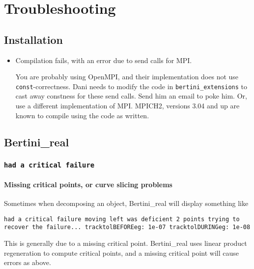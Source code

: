 
\section{Troubleshooting}

	\subsection{Installation}

	\begin{itemize}
	\item Compilation fails, with an error due to send calls for MPI.  

	You are probably using OpenMPI, and their implementation does not use {\tt const}-correctness.  Dani needs to modify the code in {\tt bertini\_extensions} to cast away constness for these send calls.  Send him an email to poke him.  Or, use a different implementation of MPI.  MPICH2, versions 3.04 and up are known to compile using the code as written. 
	\end{itemize}



\subsection{Bertini\_real}


\subsubsection{\tt had a critical failure}

\paragraph{Missing critical points, or curve slicing problems}

Sometimes when decomposing an object, Bertini\_real will display something like

{\tt	had a critical failure
 moving left was deficient 2 points
trying to recover the failure...
tracktolBEFOREeg: 1e-07 tracktolDURINGeg: 1e-08
}

This is generally due to a missing critical point.  Bertini\_real uses linear product regeneration to compute critical points, and a missing critical point will cause errors as above.  

